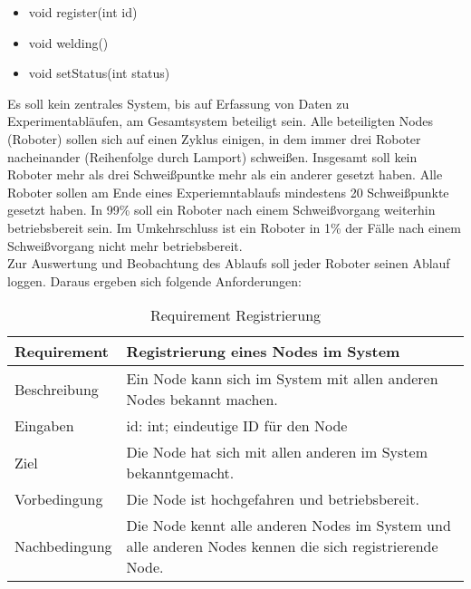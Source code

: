 \begin{itemize}
 \item void register(int id)
 \item void welding()
 \item void setStatus(int status)
\end{itemize}

Es soll kein zentrales System, bis auf Erfassung von Daten zu Experimentabläufen, am Gesamtsystem beteiligt
sein.
Alle beteiligten Nodes (Roboter) sollen sich auf einen Zyklus einigen, in dem immer drei Roboter nacheinander
(Reihenfolge durch Lamport) schweißen.
Insgesamt soll kein Roboter mehr als drei Schweißpuntke mehr als ein anderer gesetzt haben.
Alle Roboter sollen am Ende eines Experiemntablaufs mindestens 20 Schweißpunkte gesetzt haben.
In 99\% soll ein Roboter nach einem Schweißvorgang weiterhin betriebsbereit sein. Im Umkehrschluss
ist ein Roboter in 1\% der Fälle nach einem Schweißvorgang nicht mehr betriebsbereit.\\
Zur Auswertung und Beobachtung des Ablaufs soll jeder Roboter seinen Ablauf loggen.
Daraus ergeben sich folgende Anforderungen:

\begin{table}[h!]
\begin{center}
\begin{tabular}{ |p{2.5cm}|p{11cm}| } 
 \hline
 Requirement & Registrierung eines Nodes im System \\
 \hline
 Beschreibung & Ein Node kann sich im System mit allen anderen Nodes bekannt machen. \\
 \hline
 Eingaben & id: int; eindeutige ID für den Node \\
 \hline
 Ziel & Die Node hat sich mit allen anderen im System bekanntgemacht. \\
 \hline
 Vorbedingung & Die Node ist hochgefahren und betriebsbereit. \\
 \hline
 Nachbedingung & Die Node kennt alle anderen Nodes im System und alle anderen Nodes kennen die sich 
 registrierende Node. \\
 \hline
\end{tabular}
\caption{Requirement Registrierung}
\label{table:reqregister}
\end{center}
\end{table}

